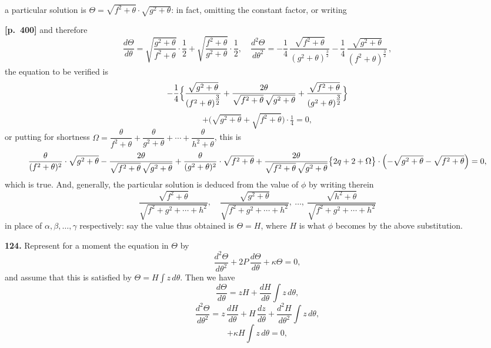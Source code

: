 \documentclass[11pt,a4paper]{article}
\begin{document}
a particular solution is $\Theta = \sqrt{f^{2}+\theta}\cdot\sqrt{g^{2}+\theta}$: in fact, omitting the constant factor, or writing

\noindent\textbf{[p.~400]}\quad
and therefore
\[
\frac{d\Theta}{d\theta} = \sqrt{\frac{g^{2}+\theta}{f^{2}+\theta}}\cdot\frac{1}{2} + \sqrt{\frac{f^{2}+\theta}{g^{2}+\theta}}\cdot\frac{1}{2},\quad\frac{d^{2}\Theta}{d\theta^{2}} = -\frac{1}{4}\,\frac{\sqrt{f^{2}+\theta}}{(g^{2}+\theta)^{\tfrac{3}{2}}} - \frac{1}{4}\,\frac{\sqrt{g^{2}+\theta}}{(f^{2}+\theta)^{\tfrac{3}{2}}}\,,
\]
the equation to be verified is
\[
-\frac{1}{4}\Bigl\{\frac{\sqrt{g^{2}+\theta}}{(f^{2}+\theta)^{\tfrac{3}{2}}} + \frac{2\theta}{\sqrt{f^{2}+\theta}\,\sqrt{g^{2}+\theta}} + \frac{\sqrt{f^{2}+\theta}}{(g^{2}+\theta)^{\tfrac{3}{2}}}\Bigr\}
\]
\[
+ \bigl(\sqrt{g^{2}+\theta} + \sqrt{f^{2}+\theta}\bigr)\cdot \tfrac{1}{4} = 0,
\]
or putting for shortness $\Omega = \dfrac{\theta}{f^{2}+\theta} + \dfrac{\theta}{g^{2}+\theta} + \cdots + \dfrac{\theta}{h^{2}+\theta}$, this is
\[
\frac{\theta}{(f^{2}+\theta)^{2}}\cdot\sqrt{g^{2}+\theta} - \frac{2\theta}{\sqrt{f^{2}+\theta}\,\sqrt{g^{2}+\theta}} + \frac{\theta}{(g^{2}+\theta)^{2}}\cdot\sqrt{f^{2}+\theta}
+ \frac{2\theta}{\sqrt{f^{2}+\theta}\,\sqrt{g^{2}+\theta}}\bigl\{2q + 2 + \Omega\bigr\}\cdot\Bigl(-\sqrt{g^{2}+\theta} - \sqrt{f^{2}+\theta}\Bigr) = 0,
\]
which is true. And, generally, the particular solution is deduced from the value of $\phi$ by writing therein
\[
\frac{\sqrt{f^{2}+\theta}}{\sqrt{f^{2}+g^{2}+\cdots+h^{2}}},\quad \frac{\sqrt{g^{2}+\theta}}{\sqrt{f^{2}+g^{2}+\cdots+h^{2}}},\ \ldots,\ \frac{\sqrt{h^{2}+\theta}}{\sqrt{f^{2}+g^{2}+\cdots+h^{2}}}
\]
in place of $\alpha, \beta, \ldots, \gamma$ respectively: say the value thus obtained is $\Theta = H$, where $H$ is what $\phi$ becomes by the above substitution.

\textbf{124.} Represent for a moment the equation in $\Theta$ by
\[
\frac{d^{2}\Theta}{d\theta^{2}} + 2P\,\frac{d\Theta}{d\theta} + \kappa\Theta = 0,
\]
and assume that this is satisfied by $\Theta = H\int z\,d\theta$. Then we have
\[
\frac{d\Theta}{d\theta} = z H + \frac{dH}{d\theta}\int z\,d\theta,
\]
\[
\frac{d^{2}\Theta}{d\theta^{2}} = z\,\frac{dH}{d\theta} + H\,\frac{dz}{d\theta} + \frac{d^{2}H}{d\theta^{2}}\int z\,d\theta,
\]
\[
+ \kappa H\int z\,d\theta = 0,
\]
\end{document}
